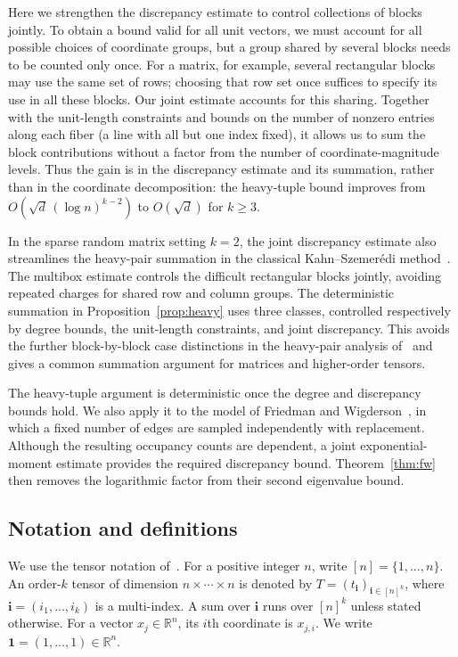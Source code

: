 \documentclass[11pt,reqno]{amsart}
\numberwithin{equation}{section}
\theoremstyle{definition}
\theoremstyle{remark}
\newcommand{\R}{\mathbb R}
\newcommand{\one}{\mathbf 1}
\begin{document}
Here we strengthen the discrepancy
estimate to control collections of blocks jointly. To obtain a
bound valid for all unit vectors, we must account for all possible
choices of coordinate groups, but a group shared by several blocks
needs to be counted only once. 
For a matrix, for example, several
rectangular blocks may use the same set of rows; choosing that row
set once suffices to specify its use in all these blocks.
Our joint estimate accounts for this sharing. Together with the
unit-length constraints and bounds on the number of nonzero entries
along each fiber (a line with all but one index fixed), it allows us
to sum the block contributions without a factor from the number of
coordinate-magnitude levels. Thus the gain is in the
discrepancy estimate and its summation, rather than in the coordinate
decomposition: the heavy-tuple bound improves from
$O(\sqrt d\,(\log n)^{k-2})$ to $O(\sqrt d)$ for $k\ge3$.

In the sparse random matrix setting $k=2$, the joint discrepancy
estimate also streamlines the heavy-pair summation in the classical
Kahn--Szemer\'edi method~\cite{FKS89,FO05,LR15}.
The multibox estimate controls the difficult rectangular blocks
jointly, avoiding repeated charges for shared row and column groups.
The deterministic summation in Proposition~\ref{prop:heavy} uses three classes,
controlled respectively by degree bounds, the unit-length constraints,
and joint discrepancy. This avoids the further block-by-block
case distinctions in the heavy-pair analysis of~\cite{LR15} and gives a common
summation argument for matrices and higher-order tensors.


The heavy-tuple argument is deterministic once the degree and
discrepancy bounds hold. We also apply it to the model of Friedman
and Wigderson~\cite{FW95}, in which a fixed number of edges are
sampled independently with replacement. Although the resulting
occupancy counts are dependent, a joint exponential-moment estimate
provides the required discrepancy bound. Theorem~\ref{thm:fw}
then removes the logarithmic factor from their second eigenvalue
bound.

\subsection{Notation and definitions}\label{sec:notation}

We use the tensor notation of~\cite{ZZ21}. For a positive integer $n$,
write $[n]=\{1,\ldots,n\}$.
An order-$k$ tensor of dimension $n\times\cdots\times n$ is denoted by
$T=(t_{\mathbf i})_{\mathbf i\in[n]^k}$, where
$\mathbf i=(i_1,\ldots,i_k)$ is a multi-index.
A sum over $\mathbf i$ runs over $[n]^k$ unless stated otherwise.
For a vector $x_j\in\R^n$, its $i$th coordinate is $x_{j,i}$.
We write $\one=(1,\ldots,1)\in\R^n$.
\end{document}
